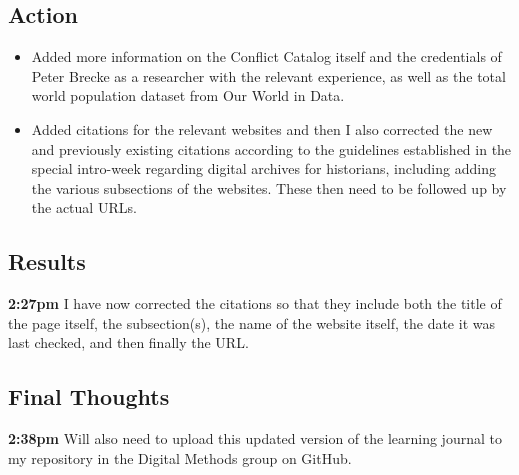 \documentclass{article}
\begin{document}
\subsection{Action}
\begin{itemize}
    \item Added more information on the Conflict Catalog itself and the credentials of Peter Brecke as a researcher with the relevant experience, as well as the total world population dataset from Our World in Data.
    \item Added citations for the relevant websites and then I also corrected the new and previously existing citations according to the guidelines established in the special intro-week regarding digital archives for historians, including adding the various subsections of the websites. These then need to be followed up by the actual URLs.
\end{itemize}

\subsection{Results}
\textbf{2:27pm} I have now corrected the citations so that they include both the title of the page itself, the subsection(s), the name of the website itself, the date it was last checked, and then finally the URL.

\subsection{Final Thoughts}
\textbf{2:38pm} Will also need to upload this updated version of the learning journal to my repository in the Digital Methods group on GitHub.
\end{document}
